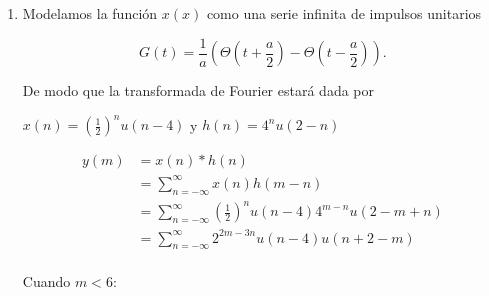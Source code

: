 \documentclass[a4paper,12pt,final]{article}
\begin{document}
\begin{enumerate}[label=\alph*)]
        \item Modelamos la función $x\left(x\right)$ como una serie infinita de
          impulsos unitarios

          \begin{equation*}
            G\left(t\right) = \frac{1}{a}\left(
                                \Theta\left(t + \frac{a}{2}\right) -
                                \Theta\left(t - \frac{a}{2}\right)
                              \right).
          \end{equation*}

          \noindent De modo que la transformada de Fourier estará dada por










        $x\left(n\right) = \left(\frac{1}{2}\right)^n u\left(n-4\right)$ y $h\left(n\right) = 4^n u\left(2-n\right)$

          \begin{equation*}
            \begin{split}
              y\left(m\right) & = x\left(n\right) * h\left(n\right) \\
                              & = \sum_{n=-\infty}^{\infty} x\left(n\right)h\left(m-n\right) \\
                              & = \sum_{n=-\infty}^{\infty} \left(\frac{1}{2}\right)^n u\left(n-4\right)4^{m-n} u\left(2-m+n\right) \\
                              & = \sum_{n=-\infty}^{\infty} 2^{2m-3n} u\left(n-4\right) u\left(n+2-m\right) \\
            \end{split}
          \end{equation*}

          \noindent Cuando $m<6$:


\end{enumerate}
\end{document}
